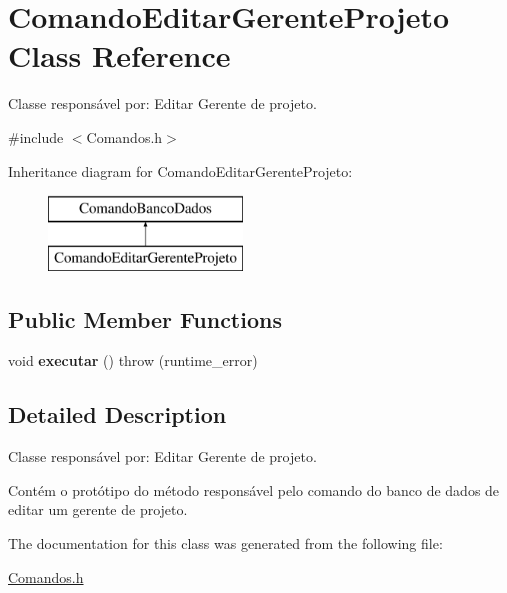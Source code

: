 \hypertarget{class_comando_editar_gerente_projeto}{}\section{Comando\+Editar\+Gerente\+Projeto Class Reference}
\label{class_comando_editar_gerente_projeto}


Classe responsável por\+: Editar Gerente de projeto.  




{\ttfamily \#include $<$Comandos.\+h$>$}

Inheritance diagram for Comando\+Editar\+Gerente\+Projeto\+:\begin{figure}[H]
\begin{center}
\leavevmode
\includegraphics[height=2.000000cm]{class_comando_editar_gerente_projeto}
\end{center}
\end{figure}
\subsection*{Public Member Functions}
\begin{DoxyCompactItemize}
\item 
\hypertarget{class_comando_editar_gerente_projeto_ad3aa8ca7e9bf932742f415e79f324c40}{}\label{class_comando_editar_gerente_projeto_ad3aa8ca7e9bf932742f415e79f324c40} 
void {\bfseries executar} ()  throw (runtime\+\_\+error)
\end{DoxyCompactItemize}


\subsection{Detailed Description}
Classe responsável por\+: Editar Gerente de projeto. 

Contém o protótipo do método responsável pelo comando do banco de dados de editar um gerente de projeto. 

The documentation for this class was generated from the following file\+:\begin{DoxyCompactItemize}
\item 
\hyperlink{_comandos_8h}{Comandos.\+h}\end{DoxyCompactItemize}
